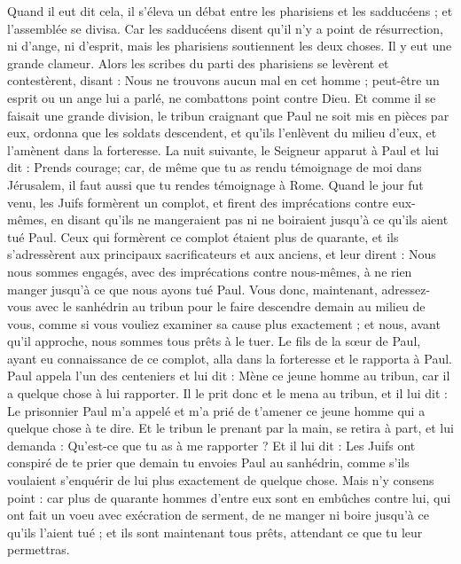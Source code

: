 \begin{multicols}{2}
{{{Quand il eut dit cela, il s'éleva un débat entre les pharisiens et les sadducéens ; et l'assemblée se divisa.
Car les sadducéens disent qu'il n'y a point de résurrection, ni d'ange, ni d'esprit, mais les pharisiens soutiennent les deux choses.
Il y eut une grande clameur. Alors les scribes du parti des pharisiens se levèrent et contestèrent, disant : Nous ne trouvons aucun mal en cet homme ; peut-être un esprit ou un ange lui a parlé, ne combattons point contre Dieu.
Et comme il se faisait une grande division, le tribun craignant que Paul ne soit mis en pièces par eux, ordonna que les soldats descendent, et qu'ils l'enlèvent du milieu d'eux, et l'amènent dans la forteresse.
La nuit suivante, le Seigneur apparut à Paul et lui dit : Prends courage; car, de même que tu as rendu témoignage de moi dans Jérusalem, il faut aussi que tu rendes témoignage à Rome.
Quand le jour fut venu, les Juifs formèrent un complot, et firent des imprécations contre eux-mêmes, en disant qu'ils ne mangeraient pas ni ne boiraient jusqu'à ce qu'ils aient tué Paul.
Ceux qui formèrent ce complot étaient plus de quarante,
et ils s'adressèrent aux principaux sacrificateurs et aux anciens, et leur dirent : Nous nous sommes engagés, avec des imprécations contre nous-mêmes, à ne rien manger jusqu'à ce que nous ayons tué Paul.
Vous donc, maintenant, adressez-vous avec le sanhédrin au tribun pour le faire descendre demain au milieu de vous, comme si vous vouliez examiner sa cause plus exactement ; et nous, avant qu'il approche, nous sommes tous prêts à le tuer.
Le fils de la sœur de Paul, ayant eu connaissance de ce complot, alla dans la forteresse et le rapporta à Paul.
Paul appela l'un des centeniers et lui dit : Mène ce jeune homme au tribun, car il a quelque chose à lui rapporter.
Il le prit donc et le mena au tribun, et il lui dit : Le prisonnier Paul m'a appelé et m'a prié de t'amener ce jeune homme qui a quelque chose à te dire.
Et le tribun le prenant par la main, se retira à part, et lui demanda : Qu'est-ce que tu as à me rapporter ?
Et il lui dit : Les Juifs ont conspiré de te prier que demain tu envoies Paul au sanhédrin, comme s'ils voulaient s'enquérir de lui plus exactement de quelque chose.
 Mais n'y consens point : car plus de quarante hommes d'entre eux sont en embûches contre lui, qui ont fait un voeu avec exécration de serment, de ne manger ni boire jusqu'à ce qu'ils l'aient tué ; et ils sont maintenant tous prêts, attendant ce que tu leur permettras.
}}}
\end{multicols}

